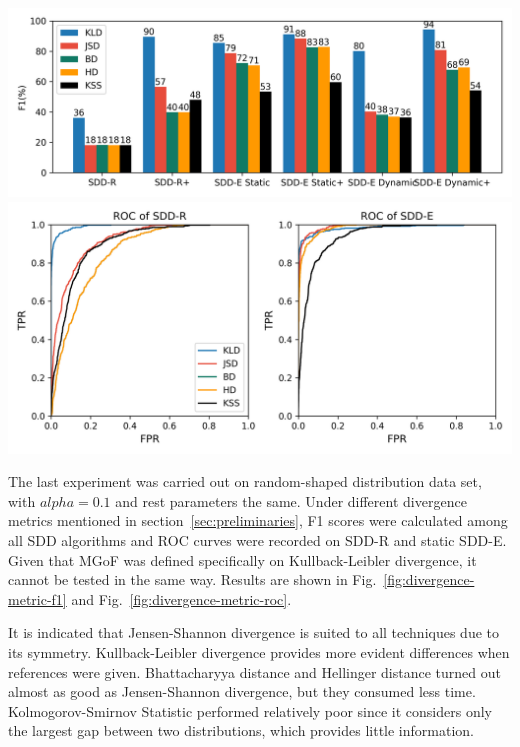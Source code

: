 \documentclass[10pt,conference,letterpaper]{article}
\begin{document}
\begin{table}
			\begin{multicols}{2}
				\includegraphics[width=\linewidth]{fig/F1OnDivergenceMetric.png}
				\label{fig:divergence-metric-f1}
				\includegraphics[width=.8\linewidth]{fig/ROCUnderDifferentMetrics.png}
				\label{fig:divergence-metric-roc}
			\end{multicols}
		\end{table}
		
		The last experiment was carried out on random-shaped distribution data set, with $alpha=0.1$ and rest parameters the same. Under different divergence metrics mentioned in section~\ref{sec:preliminaries}, F1 scores were calculated among all SDD algorithms and ROC curves were recorded on SDD-R and static SDD-E. Given that MGoF was defined specifically on Kullback-Leibler divergence, it cannot be tested in the same way. Results are shown in Fig.~\ref{fig:divergence-metric-f1} and Fig.~\ref{fig:divergence-metric-roc}.
		
		It is indicated that Jensen-Shannon divergence is suited to all techniques due to its symmetry. Kullback-Leibler divergence provides more evident differences when references were given. Bhattacharyya distance and Hellinger distance turned out almost as good as Jensen-Shannon divergence, but they consumed less time. Kolmogorov-Smirnov Statistic performed relatively poor since it considers only the largest gap between two distributions, which provides little information.
	
\end{document}
